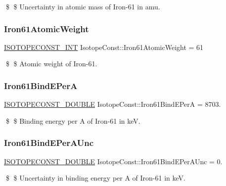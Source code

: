 \$ \$ Uncertainty in atomic mass of Iron-\/61 in amu. \mbox{\label{group___isotope_const-_iron-_fe61_gac968b4acfc866cef6ac7592415739f15}} 
\subsubsection{\texorpdfstring{Iron61\+Atomic\+Weight}{Iron61AtomicWeight}}
{\footnotesize\ttfamily \mbox{\hyperlink{group___isotope_const-_macros_ga5f18360b3e99483a35c32d789e62621c}{I\+S\+O\+T\+O\+P\+E\+C\+O\+N\+S\+T\+\_\+\+I\+NT}} Isotope\+Const\+::\+Iron61\+Atomic\+Weight = 61}

\$ \$ Atomic weight of Iron-\/61. \mbox{\label{group___isotope_const-_iron-_fe61_gaa07e47dd17102813ef6b034c6e7e290b}} 
\subsubsection{\texorpdfstring{Iron61\+Bind\+E\+PerA}{Iron61BindEPerA}}
{\footnotesize\ttfamily \mbox{\hyperlink{group___isotope_const-_macros_ga8f45a7272ce02c0b4c65c44636ed719a}{I\+S\+O\+T\+O\+P\+E\+C\+O\+N\+S\+T\+\_\+\+D\+O\+U\+B\+LE}} Isotope\+Const\+::\+Iron61\+Bind\+E\+PerA = 8703.}

\$ \$ Binding energy per A of Iron-\/61 in keV. \mbox{\label{group___isotope_const-_iron-_fe61_gaaef6cc67cfd46a57700119c4fdbc7587}} 
\subsubsection{\texorpdfstring{Iron61\+Bind\+E\+Per\+A\+Unc}{Iron61BindEPerAUnc}}
{\footnotesize\ttfamily \mbox{\hyperlink{group___isotope_const-_macros_ga8f45a7272ce02c0b4c65c44636ed719a}{I\+S\+O\+T\+O\+P\+E\+C\+O\+N\+S\+T\+\_\+\+D\+O\+U\+B\+LE}} Isotope\+Const\+::\+Iron61\+Bind\+E\+Per\+A\+Unc = 0.}

\$ \$ Uncertainty in binding energy per A of Iron-\/61 in keV. \mbox{\label{group___isotope_const-_iron-_fe61_ga60d24e32c691d9efadcd8e83c7823463}} 
